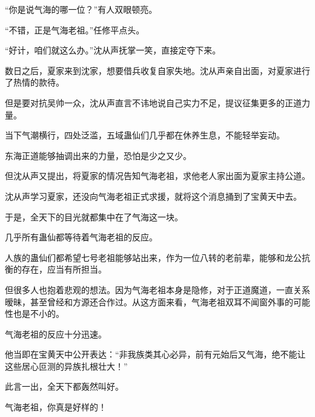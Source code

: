 \begin{this_body}
“你是说气海的哪一位？”有人双眼顿亮。

“不错，正是气海老祖。”任修平点头。

“好计，咱们就这么办。”沈从声抚掌一笑，直接定夺下来。

数日之后，夏家来到沈家，想要借兵收复自家失地。沈从声亲自出面，对夏家进行了热情的款待。

但是要对抗吴帅一众，沈从声直言不讳地说自己实力不足，提议征集更多的正道力量。

当下气潮横行，四处泛滥，五域蛊仙们几乎都在休养生息，不能轻举妄动。

东海正道能够抽调出来的力量，恐怕是少之又少。

但沈从声又提出，将夏家的情况告知气海老祖，求他老人家出面为夏家主持公道。

沈从声学习夏家，还没向气海老祖正式求援，就将这个消息捅到了宝黄天中去。

于是，全天下的目光就都集中在了气海这一块。

几乎所有蛊仙都等待着气海老祖的反应。

人族的蛊仙们都希望七号老祖能够站出来，作为一位八转的老前辈，能够和龙公抗衡的存在，应当有所担当。

但很多人也抱着悲观的想法。因为气海老祖本身是隐修，对于正道魔道，一直关系暧昧，甚至曾经和方源还合作过。从这方面来看，气海老祖双耳不闻窗外事的可能性也是不小的。

气海老祖的反应十分迅速。

他当即在宝黄天中公开表达：“非我族类其心必异，前有元始后又气海，绝不能让这些居心叵测的异族扎根壮大！”

此言一出，全天下都轰然叫好。

气海老祖，你真是好样的！

\end{this_body}

